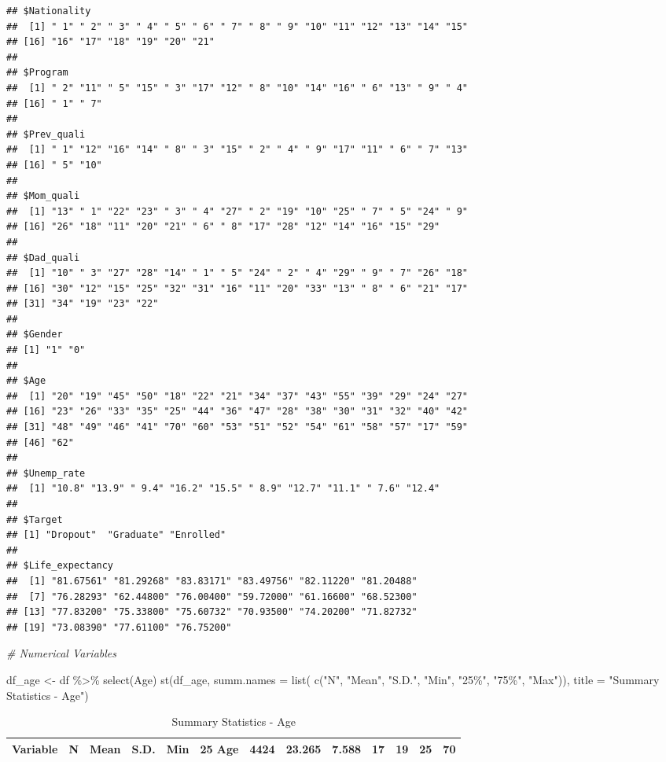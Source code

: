 \documentclass[
]{article}
\newenvironment{Shaded}{\begin{snugshade}}{\end{snugshade}}
\newcommand{\AttributeTok}[1]{\textcolor[rgb]{0.77,0.63,0.00}{#1}}
\newcommand{\CommentTok}[1]{\textcolor[rgb]{0.56,0.35,0.01}{\textit{#1}}}
\newcommand{\FunctionTok}[1]{\textcolor[rgb]{0.00,0.00,0.00}{#1}}
\newcommand{\NormalTok}[1]{#1}
\newcommand{\OtherTok}[1]{\textcolor[rgb]{0.56,0.35,0.01}{#1}}
\newcommand{\SpecialCharTok}[1]{\textcolor[rgb]{0.00,0.00,0.00}{#1}}
\newcommand{\StringTok}[1]{\textcolor[rgb]{0.31,0.60,0.02}{#1}}
\begin{document}
\begin{verbatim}
## $Nationality
##  [1] " 1" " 2" " 3" " 4" " 5" " 6" " 7" " 8" " 9" "10" "11" "12" "13" "14" "15"
## [16] "16" "17" "18" "19" "20" "21"
## 
## $Program
##  [1] " 2" "11" " 5" "15" " 3" "17" "12" " 8" "10" "14" "16" " 6" "13" " 9" " 4"
## [16] " 1" " 7"
## 
## $Prev_quali
##  [1] " 1" "12" "16" "14" " 8" " 3" "15" " 2" " 4" " 9" "17" "11" " 6" " 7" "13"
## [16] " 5" "10"
## 
## $Mom_quali
##  [1] "13" " 1" "22" "23" " 3" " 4" "27" " 2" "19" "10" "25" " 7" " 5" "24" " 9"
## [16] "26" "18" "11" "20" "21" " 6" " 8" "17" "28" "12" "14" "16" "15" "29"
## 
## $Dad_quali
##  [1] "10" " 3" "27" "28" "14" " 1" " 5" "24" " 2" " 4" "29" " 9" " 7" "26" "18"
## [16] "30" "12" "15" "25" "32" "31" "16" "11" "20" "33" "13" " 8" " 6" "21" "17"
## [31] "34" "19" "23" "22"
## 
## $Gender
## [1] "1" "0"
## 
## $Age
##  [1] "20" "19" "45" "50" "18" "22" "21" "34" "37" "43" "55" "39" "29" "24" "27"
## [16] "23" "26" "33" "35" "25" "44" "36" "47" "28" "38" "30" "31" "32" "40" "42"
## [31] "48" "49" "46" "41" "70" "60" "53" "51" "52" "54" "61" "58" "57" "17" "59"
## [46] "62"
## 
## $Unemp_rate
##  [1] "10.8" "13.9" " 9.4" "16.2" "15.5" " 8.9" "12.7" "11.1" " 7.6" "12.4"
## 
## $Target
## [1] "Dropout"  "Graduate" "Enrolled"
## 
## $Life_expectancy
##  [1] "81.67561" "81.29268" "83.83171" "83.49756" "82.11220" "81.20488"
##  [7] "76.28293" "62.44800" "76.00400" "59.72000" "61.16600" "68.52300"
## [13] "77.83200" "75.33800" "75.60732" "70.93500" "74.20200" "71.82732"
## [19] "73.08390" "77.61100" "76.75200"
\end{verbatim}

\begin{Shaded}
\begin{Highlighting}[]
\CommentTok{\# Numerical Variables}

\NormalTok{df\_age }\OtherTok{\textless{}{-}}\NormalTok{ df }\SpecialCharTok{\%\textgreater{}\%} \FunctionTok{select}\NormalTok{(Age)}
\FunctionTok{st}\NormalTok{(df\_age,}
   \AttributeTok{summ.names =} \FunctionTok{list}\NormalTok{(}
     \FunctionTok{c}\NormalTok{(}\StringTok{"N"}\NormalTok{, }\StringTok{"Mean"}\NormalTok{, }\StringTok{"S.D."}\NormalTok{, }\StringTok{"Min"}\NormalTok{, }\StringTok{"25\%"}\NormalTok{, }\StringTok{"75\%"}\NormalTok{, }\StringTok{"Max"}\NormalTok{)),}
   \AttributeTok{title =} \StringTok{"Summary Statistics {-} Age"}\NormalTok{)}
\end{Highlighting}
\end{Shaded}

\begin{table}

\caption{\label{tab:unnamed-chunk-5}Summary Statistics - Age}
\centering
\begin{tabular}[t]{llllllll}
\toprule
Variable & N & Mean & S.D. & Min & 25%
\midrule
Age & 4424 & 23.265 & 7.588 & 17 & 19 & 25 & 70\\
\bottomrule
\end{tabular}
\end{table}
\end{document}
